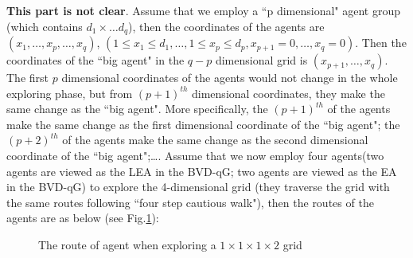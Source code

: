 {\bf This part is not clear}. Assume that we employ a ``p dimensional" agent group (which contains $d_1 \times \ldots d_q$), then the coordinates of the agents are $(x_1, \ldots, x_p, \ldots, x_q)$, $(1\leq x_1\leq d_1, \ldots, 1\leq x_p\leq d_p, x_{p+1}=0, \ldots, x_q=0)$. Then the coordinates of the ``big agent" in the $q-p$ dimensional grid is $(x_{p+1},\ldots, x_q)$.
The first $p$ dimensional coordinates of the agents would not change in the whole exploring phase, but from $(p+1)^{th}$ dimensional coordinates, they make the same change as the ``big agent". More specifically, the $(p+1)^{th}$ of the agents make the same change as the first dimensional coordinate of the ``big agent"; the $(p+2)^{th}$ of the agents make the same change as the second dimensional coordinate of the ``big agent";\ldots. 
Assume that we now employ four agents(two agents are viewed as the LEA in the BVD-qG; two agents are viewed as the EA in the BVD-qG) to explore the 4-dimensional grid (they traverse the grid with the same routes following ``four step cautious walk"), then the routes of the agents are as below (see Fig.\ref{fig:grouproute}):
\begin{figure} [H]
  \centering 
    \hspace{1in} 
    \caption{The route of agent when exploring a $1\times1\times1\times2$ grid } 
  \label{fig:grouproute} %
\end{figure}

